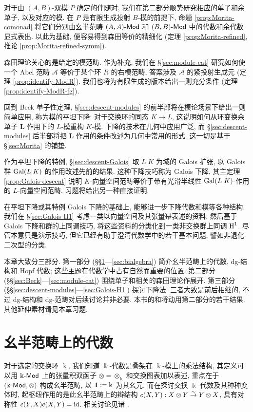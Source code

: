 对于由 $(A, B)$-双模 $P$ 确定的伴随对, 我们在第二部分顺势研究相应的单子和余单子, 以及对应的模. 在 $P$ 是有限生成投射 $B$-模的前提下, 命题 \ref{prop:Morita-comonad} 将它们分别由幺半范畴 $(A, A)\text{-}\mathsf{Mod}$ 和 $(B, B)\text{-}\mathsf{Mod}$ 中的代数和余代数显式表出. 以此为基础, 便容易得到森田等价的精细化 (定理 \ref{prop:Morita-refined}, 推论 \ref{prop:Morita-refined-symm}).

森田理论关心的是给定的模范畴. 作为补充, 我们在 \S\ref{sec:module-cat} 研究如何使一个 Abel 范畴 $\mathcal{A}$ 等价于某个环 $R$ 的右模范畴, 答案涉及 $\mathcal{A}$ 的紧投射生成元 (定理 \ref{prop:identify-ModR}). 我们也将为有限生成的版本给出一则充分条件 (定理 \ref{prop:identify-ModR-fg}).

回到 Beck 单子性定理, \S\ref{sec:descent-modules} 的前半部将在模论场景下给出一则简单应用, 称为模的平坦下降: 对于交换环的同态 $K \to L$, 这说明如何从环变换余单子 $\mathbf{L}$ 作用下的 $L$-模重构 $K$-模. 下降的技术在几何中应用广泛, 而 \S\ref{sec:descent-modules} 后半部将把 $\mathbf{L}$ 作用的条件改述为几何中常用的形式. 这一切是基于 \S\ref{sec:Morita} 的铺垫.

作为平坦下降的特例, \S\ref{sec:descent-Galois} 取 $L|K$ 为域的 Galois 扩张, 以 Galois 群 $\operatorname{Gal}(L|K)$ 的作用改述先前的结果. 这种下降技巧称为 Galois 下降, 其主定理 \ref{prop:Galois-descent} 说明 $K$-向量空间范畴等价于带有光滑半线性 $\operatorname{Gal}(L|K)$-作用的 $L$-向量空间范畴. 习题将给出另一种直接证明.

在平坦下降或其特例 Galois 下降的基础上, 能够进一步下降代数和模等各种结构. 我们在 \S\ref{sec:Galois-H1} 考虑一类以向量空间及其张量幂表述的资料, 然后基于 Galois 下降和群的上同调技巧, 将这些资料的分类化到一类非交换群上同调 $\operatorname{H}^1$. 尽管本意只是演示技巧, 但它已经有助于澄清代数学中的若干基本问题, 譬如非退化二次型的分类.

\begin{wenxintishi}
	本章大致分三部分. 第一部分 (\S\S\ref{sec:alg-in-monoidal-cat}---\ref{sec:bialgebra}) 简介幺半范畴上的代数, dg-结构和 Hopf 代数; 这些主题在代数学中占有自然而重要的位置. 第二部分 (\S\S\ref{sec:Beck}---\ref{sec:module-cat}) 围绕单子和相关的森田理论作展开. 第三部分 (\S\S\ref{sec:descent-modules}---\ref{sec:Galois-H1}) 探讨下降法. 三者大致是前后相继的, 不过 dg-结构和 dg-范畴对后续讨论并非必要. 本书的和将动用第二部分的若干结果. 其他延伸素材请见本章习题.
\end{wenxintishi}

\section{幺半范畴上的代数}\label{sec:alg-in-monoidal-cat}
对于选定的交换环 $\Bbbk$, 我们知道 $\Bbbk$-代数是叠架在 $\Bbbk$-模上的乘法结构, 其定义可以用 $\Bbbk\text{-}\mathsf{Mod}$ 上的张量积双函子 $\otimes = \otimes_{\Bbbk}$ 和交换图表加以表述, 重点在于 $(\Bbbk\text{-}\mathsf{Mod}, \otimes)$ 构成幺半范畴, 以 $\bm{1} := \Bbbk$ 为其幺元. 而在探讨交换 $\Bbbk$-代数及其种种变体时, 起枢纽作用的是此幺半范畴上的辫结构 $c(X, Y): X \otimes Y \stackrel{\sim}{\rightarrow} Y \otimes X$, 具有对称性 $c(Y,X)c(X,Y) = \mathrm{id}$. 相关讨论见诸 \cite[\S 7.4]{Li1}.

